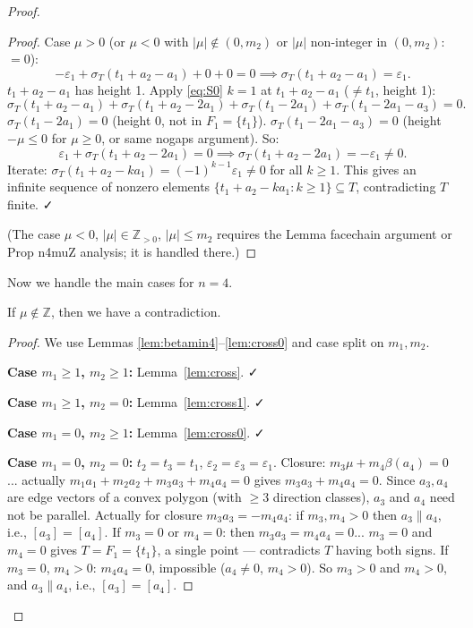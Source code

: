 \begin{proof}
\begin{proof}
Case $\mu>0$ (or $\mu<0$ with $|\mu|\notin(0,m_2)$ or $|\mu|$ non-integer in $(0,m_2)$: $=0$):
\[
  -\varepsilon_1+\sigma_T(t_1+a_2-a_1)+0+0=0 \implies \sigma_T(t_1+a_2-a_1)=\varepsilon_1.
\]
$t_1+a_2-a_1$ has height 1. Apply \eqref{eq:S0} $k=1$ at $t_1+a_2-a_1$ ($\neq t_1$, height 1):
\[
  \sigma_T(t_1+a_2-a_1)+\sigma_T(t_1+a_2-2a_1)+\sigma_T(t_1-2a_1)+\sigma_T(t_1-2a_1-a_3)=0.
\]
$\sigma_T(t_1-2a_1)=0$ (height 0, not in $F_1=\{t_1\}$). $\sigma_T(t_1-2a_1-a_3)=0$ (height $-\mu\leq 0$ for $\mu \geq 0$, or same nogaps argument). So:
\[
  \varepsilon_1+\sigma_T(t_1+a_2-2a_1)=0 \implies \sigma_T(t_1+a_2-2a_1)=-\varepsilon_1 \neq 0.
\]
Iterate: $\sigma_T(t_1+a_2-ka_1)=(-1)^{k-1}\varepsilon_1 \neq 0$ for all $k \geq 1$. This gives an infinite sequence of nonzero elements $\{t_1+a_2-ka_1:k\geq 1\} \subseteq T$, contradicting $T$ finite. ✓

(The case $\mu<0$, $|\mu| \in \mathbb{Z}_{>0}$, $|\mu| \leq m_2$ requires the Lemma facechain argument or Prop n4muZ analysis; it is handled there.)
\end{proof}

\bigskip

Now we handle the main cases for $n=4$.

\begin{proposition}\label{prop:n4mu}
If $\mu \notin \mathbb{Z}$, then we have a contradiction.
\end{proposition}
\begin{proof}
We use Lemmas \ref{lem:betamin4}--\ref{lem:cross0} and case split on $m_1,m_2$.

\textbf{Case $m_1 \geq 1$, $m_2 \geq 1$:} Lemma~\ref{lem:cross}. ✓

\textbf{Case $m_1 \geq 1$, $m_2 = 0$:} Lemma~\ref{lem:cross1}. ✓

\textbf{Case $m_1 = 0$, $m_2 \geq 1$:} Lemma~\ref{lem:cross0}. ✓

\textbf{Case $m_1 = 0$, $m_2 = 0$:} $t_2=t_3=t_1$, $\varepsilon_2=\varepsilon_3=\varepsilon_1$. Closure: $m_3\mu+m_4\beta(a_4)=0$... actually $m_1a_1+m_2a_2+m_3a_3+m_4a_4=0$ gives $m_3a_3+m_4a_4=0$. Since $a_3,a_4$ are edge vectors of a convex polygon (with $\geq 3$ direction classes), $a_3$ and $a_4$ need not be parallel. Actually for closure $m_3a_3=-m_4a_4$: if $m_3,m_4>0$ then $a_3 \parallel a_4$, i.e., $[a_3]=[a_4]$. If $m_3=0$ or $m_4=0$: then $m_3a_3=m_4a_4=0$... $m_3=0$ and $m_4=0$ gives $T=F_1=\{t_1\}$, a single point — contradicts $T$ having both signs. If $m_3=0$, $m_4>0$: $m_4a_4=0$, impossible ($a_4 \neq 0$, $m_4>0$). So $m_3>0$ and $m_4>0$, and $a_3\parallel a_4$, i.e., $[a_3]=[a_4]$.


\end{proof}
\end{proof}
